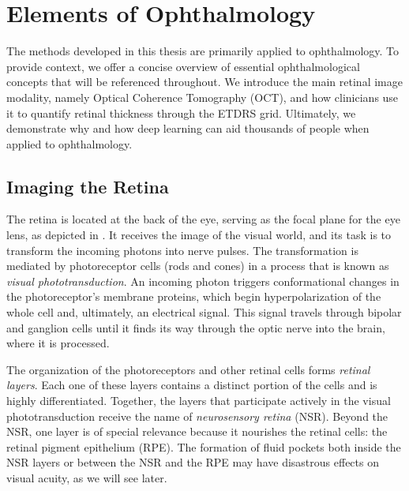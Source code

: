 
\section{Elements of Ophthalmology}
\label{sec:ophthalmology}

The methods developed in this thesis are primarily applied to ophthalmology. To provide context, we offer a concise overview of essential ophthalmological concepts that will be referenced throughout. We introduce the main retinal image modality, namely Optical Coherence Tomography (OCT), and how clinicians use it to quantify retinal thickness through the ETDRS grid. Ultimately, we demonstrate why and how deep learning can aid thousands of people when applied to ophthalmology.

\subsection{Imaging the Retina}
The retina is located at the back of the eye, serving as the focal plane for the eye lens, as depicted in . It receives the image of the visual world, and its task is to transform the incoming photons into nerve pulses. The transformation is mediated by photoreceptor cells (rods and cones) in a process that is known as \textit{visual phototransduction}. An incoming photon triggers conformational changes in the photoreceptor's membrane proteins, which begin hyperpolarization of the whole cell and, ultimately, an electrical signal. This signal travels through bipolar and ganglion cells until it finds its way through the optic nerve into the brain, where it is processed.


The organization of the photoreceptors and other retinal cells forms \textit{retinal layers}. Each one of these layers contains a distinct portion of the cells and is highly differentiated. Together, the layers that participate actively in the visual phototransduction receive the name of \textit{neurosensory retina} (NSR). Beyond the NSR, one layer is of special relevance because it nourishes the retinal cells: the retinal pigment epithelium (RPE). The formation of fluid pockets both inside the NSR layers or between the NSR and the RPE may have disastrous effects on visual acuity, as we will see later.

